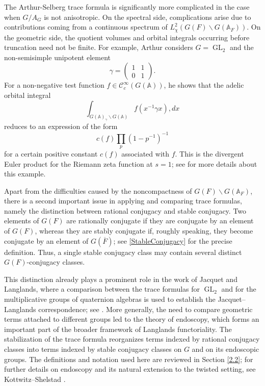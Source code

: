 \documentclass[11pt,a4paper]{article}
\theoremstyle{definition}
\theoremstyle{plain}
\theoremstyle{remark}
\theoremstyle{plain}
\DeclareMathOperator{\GL}{GL}
\begin{document}
The Arthur-Selberg trace formula is significantly more complicated in the case when $G/ A_G$ is not anisotropic. On the spectral side, complications arise due to contributions coming from a continuous spectrum of $L^2_{\chi}(G(F) \backslash G(\mathbb{A}_F))$. On the geometric side, the quotient volumes and orbital integrals occurring before truncation need not be finite. For example, Arthur considers $G=\GL_2$ and the non-semisimple unipotent element
$$
\gamma=
\begin{pmatrix}
1 & 1\\
0 & 1
\end{pmatrix}.
$$
For a non-negative test function $f \in \mathcal{C}_c^{\infty}(G(\mathbb{A}))$, he shows that the adelic orbital integral
$$
\int_{G(\mathbb{A})_{\gamma}\backslash G(\mathbb{A})}
f(x^{-1}\gamma x),dx
$$
reduces to an expression of the form
$$
c(f)\prod_p(1-p^{-1})^{-1}
$$
for a certain positive constant $c(f)$ associated with $f$. This is the divergent Euler product for the Riemann zeta function at $s=1$; see \cite[\S 4]{MR2192011} for more details about this example.

Apart from the difficulties caused by the noncompactness of $G(F)\backslash G(\mathbb{A}_F)$, there is a second important issue in applying and comparing trace formulas, namely the distinction between rational conjugacy and stable conjugacy. Two elements of $G(F)$ are rationally conjugate if they are conjugate by an element of $G(F)$, whereas they are stably conjugate if, roughly speaking, they become conjugate by an element of $G(\overline{F})$; see \ref{StableConjugacy} for the precise definition. Thus, a single stable conjugacy class may contain several distinct $G(F)$-conjugacy classes.

This distinction already plays a prominent role in the work of Jacquet and Langlands, where a comparison between the trace formulas for $\GL_2$ and for the multiplicative groups of quaternion algebras is used to establish the Jacquet--Langlands correspondence; see \cite{MR401654}. More generally, the need to compare geometric terms attached to different groups led to the theory of endoscopy, which forms an important part of the broader framework of Langlands functoriality. The stabilization of the trace formula reorganizes terms indexed by rational conjugacy classes into terms indexed by stable conjugacy classes on $G$ and on its endoscopic groups. The definitions and notation used here are reviewed in Section \ref{2.2}; for further details on endoscopy and its natural extension to the twisted setting, see Kottwitz--Shelstad \cite{MR1687096}.
\end{document}

